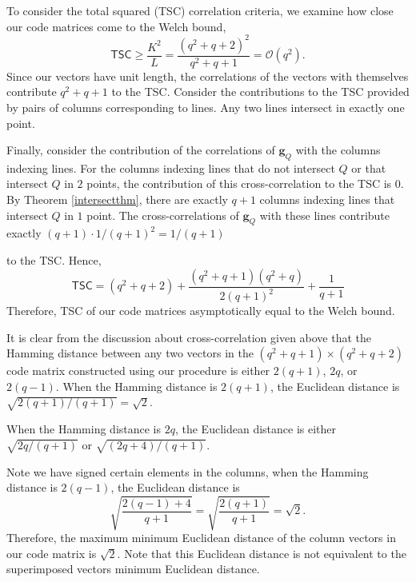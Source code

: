 \documentclass[journal,comsoc]{IEEEtran}
\begin{document}
To consider the total squared (TSC) correlation criteria, we examine how close our code matrices come to the Welch bound, 
\[\textsf{TSC} \geq \frac{K^2}{L} = \frac{(q^2+q+2)^2}{q^2+q+1} = \mathcal{O}(q^2).\]
Since our vectors have unit length, the correlations of the vectors with themselves contribute $q^2+q+1$ to the TSC. Consider the contributions to the TSC provided by pairs of columns corresponding to lines. Any two lines intersect in exactly one point. \iffalse Therefore, any given pair contributes $1/(q+1)^2$ to the TSC. There are 
\[{q^2+q+1 \choose 2} = \frac{(q^2+q+1)(q^2+q)}{2}\]
such pairs of lines. Altogether, correlations of pairs of columns corresponding to lines contribute 
\[\frac{(q^2+q+1)(q^2+q)}{2(q+1)^2}\]
to the TSC.\fi

Finally, consider the contribution of the correlations of $\mathbf{g}_Q$ with the columns indexing lines. For the columns indexing lines that do not intersect $Q$ or that intersect $Q$ in $2$ points, the contribution of this cross-correlation to the TSC is $0$. By Theorem \ref{intersectthm}, there are exactly $q+1$ columns indexing lines that intersect $Q$ in $1$ point. The cross-correlations of $\mathbf{g}_Q$ with these lines contribute exactly $(q+1) \cdot {1}/{(q+1)^2} = {1}/{(q+1)}$
\iffalse \[(q+1) \cdot \frac{1}{(q+1)^2} = \frac{1}{q+1}\] \fi
to the TSC. Hence, 
\[\textsf{TSC} = (q^2+q+2) + \frac{(q^2+q+1)(q^2+q)}{2(q+1)^2} + \frac{1}{q+1}\] \iffalse \[=  \frac{3}{2}q^2 + \mathcal{O}(q) = \mathcal{O}(q^2). \]\fi
Therefore, TSC of our code matrices asymptotically equal to the Welch bound.
\iffalse Thus, the TSC of our code matrices seems to be slightly larger than the Welch bound. However, it is asymptotically equal to the Welch bound. \fi

\iffalse We conclude this subsection by considering the maximum minimum Euclidean distance of the column vectors in our code matrices. \fi It is clear from the discussion about cross-correlation given above that the Hamming distance between any two vectors in the $(q^2+q+1)\times (q^2+q+2)$ code matrix constructed using our procedure is either $2(q+1)$, $2q$, or $2(q-1)$. When the Hamming distance is $2(q+1)$, the Euclidean distance is $\sqrt{{2(q+1)}/{(q+1)}} = \sqrt{2}$.
\iffalse \[\sqrt{\frac{2(q+1)}{q+1}} = \sqrt{2}.\] \fi
When the Hamming distance is $2q$, the Euclidean distance is either $\sqrt{{2q}/{(q+1)}}$ or $\sqrt{{(2q+4)}/{(q+1)}}$.
\iffalse \[\sqrt{\frac{2q}{q+1}} \: \: \text{or} \: \:  \sqrt{\frac{2q+4}{q+1}}.\]\fi
Note we have signed certain elements in the columns, when the Hamming distance is $2(q-1)$, the Euclidean distance is 
\[\sqrt{\frac{2(q-1)+4}{q+1}} = \sqrt{\frac{2(q+1)}{q+1}} = \sqrt{2}.\]
Therefore, the maximum minimum Euclidean distance of the column vectors in our code matrix is $\sqrt{2}$. Note that this Euclidean distance is not equivalent to the superimposed vectors minimum Euclidean distance.
\iffalse
\end{document}
